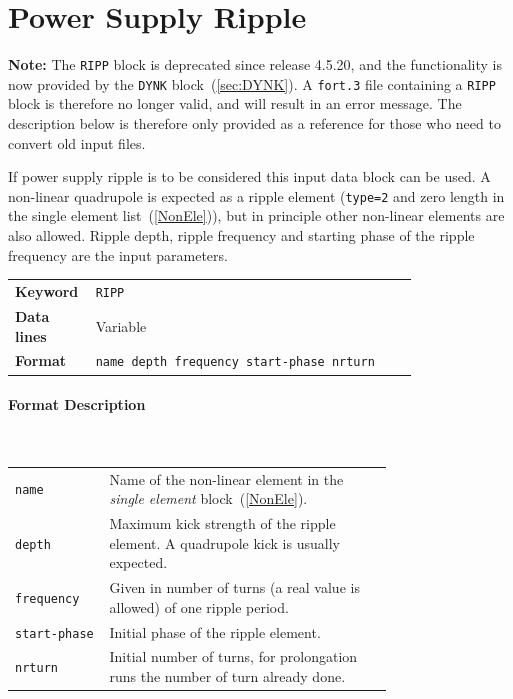 \begin{center}
\begin{longtable}{|c|c|l|}
\end{longtable}
\end{center}

\section{Power Supply Ripple} \label{PowRip}

\textcolor{notered}{\textbf{Note:}
The \texttt{RIPP} block is deprecated since release 4.5.20, and the functionality is now provided by the \texttt{DYNK} block~(\ref{sec:DYNK}).
A \texttt{fort.3} file containing a \texttt{RIPP} block is therefore no longer valid, and will result in an error message.
The description below is therefore only provided as a reference for those who need to convert old input files.}

\bigskip
\noindent If power supply ripple is to be considered this input data block can be used. A non-linear quadrupole is expected as a ripple element (\texttt{type=2} and zero length in the single element list~(\ref{NonEle})), but in principle other non-linear elements are also allowed.
Ripple depth, ripple frequency and starting phase of the ripple frequency are the input parameters.

\bigskip
\begin{tabular}{@{}lp{0.8\linewidth}}
    \textbf{Keyword}    & \texttt{RIPP} \\
    \textbf{Data lines} & Variable \\
    \textbf{Format}     & \texttt{name depth frequency start-phase nrturn}
\end{tabular}

\paragraph{Format Description}~

\bigskip
\begin{longtabu}{@{}lp{0.75\linewidth}}
    \texttt{name}        & Name of the non-linear element in the \textit{single element} block~(\ref{NonEle}). \\
    \texttt{depth}       & Maximum kick strength of the ripple element. A quadrupole kick is usually expected. \\
    \texttt{frequency}   & Given in number of turns (a real value is allowed) of one ripple period. \\
    \texttt{start-phase} & Initial phase of the ripple element. \\
    \texttt{nrturn}      & Initial number of turns, for prolongation runs the  number of turn already done.
\end{longtabu}

